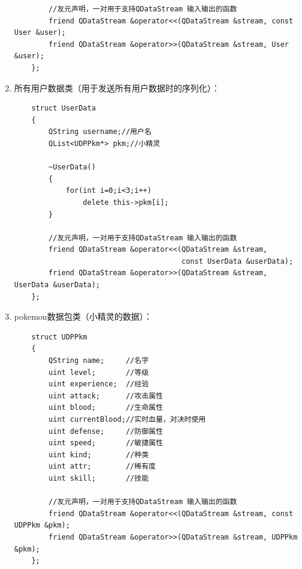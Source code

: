 \documentclass{ctexart}
\begin{document}
\begin{enumerate}
\begin{lstlisting}
        //友元声明，一对用于支持QDataStream 输入输出的函数
        friend QDataStream &operator<<(QDataStream &stream, const User &user);
        friend QDataStream &operator>>(QDataStream &stream, User &user);
    };
  \end{lstlisting}
  \item 所有用户数据类（用于发送所有用户数据时的序列化）：
  \lstset{language=C++}
  \begin{lstlisting}
    struct UserData
    {
        QString username;//用户名
        QList<UDPPkm*> pkm;//小精灵

        ~UserData()
        {
            for(int i=0;i<3;i++)
                delete this->pkm[i];
        }

        //友元声明，一对用于支持QDataStream 输入输出的函数
        friend QDataStream &operator<<(QDataStream &stream,
                                       const UserData &userData);
        friend QDataStream &operator>>(QDataStream &stream, UserData &userData);
    };
  \end{lstlisting}
  \item pokemon数据包类（小精灵的数据）：
  \lstset{language=C++}
  \begin{lstlisting}
    struct UDPPkm
    {
        QString name;     //名字
        uint level;       //等级
        uint experience;  //经验
        uint attack;      //攻击属性
        uint blood;       //生命属性
        uint currentBlood;//实时血量，对决时使用
        uint defense;     //防御属性
        uint speed;       //敏捷属性
        uint kind;        //种类
        uint attr;        //稀有度
        uint skill;       //技能

        //友元声明，一对用于支持QDataStream 输入输出的函数
        friend QDataStream &operator<<(QDataStream &stream, const UDPPkm &pkm);
        friend QDataStream &operator>>(QDataStream &stream, UDPPkm &pkm);
    };
  \end{lstlisting}
\end{enumerate}
\end{document}
